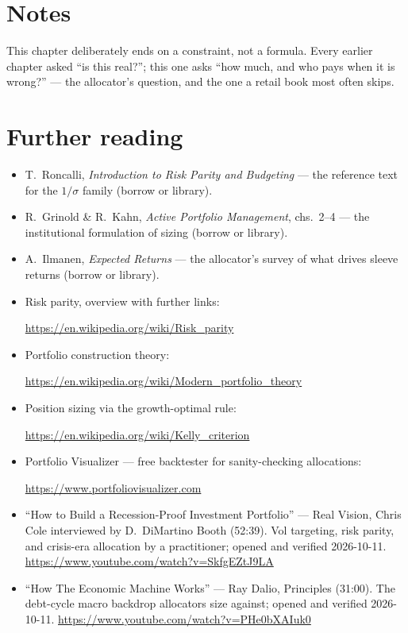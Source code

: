 \section*{Notes}
This chapter deliberately ends on a constraint, not a formula.
Every earlier chapter asked ``is this real?''; this one asks
``how much, and who pays when it is wrong?'' --- the allocator's
question, and the one a retail book most often skips.

\section*{Further reading}
\begin{itemize}
\item T.~Roncalli, \emph{Introduction to Risk Parity and
Budgeting} --- the reference text for the $1/\sigma$ family
(borrow or library).
\item R.~Grinold \& R.~Kahn, \emph{Active Portfolio Management},
chs.~2--4 --- the institutional formulation of sizing (borrow or
library).
\item A.~Ilmanen, \emph{Expected Returns} --- the allocator's
survey of what drives sleeve returns (borrow or library).
\item Risk parity, overview with further links:

\url{https://en.wikipedia.org/wiki/Risk_parity}
\item Portfolio construction theory:

\url{https://en.wikipedia.org/wiki/Modern_portfolio_theory}
\item Position sizing via the growth-optimal rule:

\url{https://en.wikipedia.org/wiki/Kelly_criterion}
\item Portfolio Visualizer --- free backtester for sanity-checking
allocations:

\url{https://www.portfoliovisualizer.com}
\end{itemize}

\begin{rulebox}
\begin{itemize}
\item ``How to Build a Recession-Proof Investment Portfolio'' ---
Real Vision, Chris Cole interviewed by D.~DiMartino Booth
(52:39). Vol targeting, risk parity, and crisis-era allocation
by a practitioner; opened and verified 2026-10-11.
\url{https://www.youtube.com/watch?v=SkfgEZtJ9LA}
\item ``How The Economic Machine Works'' --- Ray Dalio,
Principles (31:00). The debt-cycle macro backdrop allocators
size against; opened and verified 2026-10-11.
\url{https://www.youtube.com/watch?v=PHe0bXAIuk0}
\end{itemize}
\end{rulebox}
